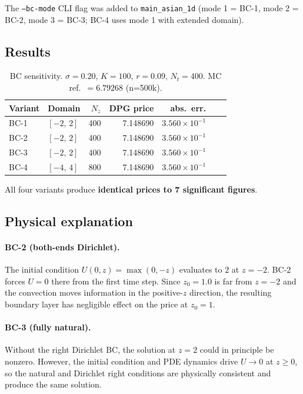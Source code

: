 \documentclass[11pt,a4paper]{article}
\newcommand{\Nz}{N_z}
\newcommand{\Nt}{N_t}
\begin{document}
The \texttt{--bc-mode} CLI flag was added to \texttt{main\_asian\_1d}
(mode 1 = BC-1, mode 2 = BC-2, mode 3 = BC-3; BC-4 uses mode 1 with
extended domain).

\subsection{Results}

\begin{table}[htbp]
\centering
\caption{BC sensitivity.  $\sigma = 0.20$, $K = 100$,
         $r = 0.09$, $\Nt = 400$.  MC ref.\ $= 6.79268$ (n=500k).}
\label{tab:bcsens}
\begin{tabular}{llrrrrr}
\toprule
Variant & Domain & $\Nz$ & DPG price & abs.\ err. \\
\midrule
BC-1 & $[-2,\,2]$ & 400 & 7.148690 & $3.560\times10^{-1}$ \\
BC-2 & $[-2,\,2]$ & 400 & 7.148690 & $3.560\times10^{-1}$ \\
BC-3 & $[-2,\,2]$ & 400 & 7.148690 & $3.560\times10^{-1}$ \\
BC-4 & $[-4,\,4]$ & 800 & 7.148690 & $3.560\times10^{-1}$ \\
\bottomrule
\end{tabular}
\end{table}

All four variants produce \textbf{identical prices to 7 significant
figures}.

\subsection{Physical explanation}

\paragraph{BC-2 (both-ends Dirichlet).}
The initial condition $U(0, z) = \max(0, -z)$ evaluates to $2$ at
$z = -2$.  BC-2 forces $U = 0$ there from the first time step.
Since $z_0 = 1.0$ is far from $z = -2$ and the convection moves
information in the positive-$z$ direction, the resulting boundary
layer has negligible effect on the price at $z_0 = 1$.

\paragraph{BC-3 (fully natural).}
Without the right Dirichlet BC, the solution at $z = 2$ could in
principle be nonzero.  However, the initial condition and PDE dynamics
drive $U \to 0$ at $z \ge 0$, so the natural and Dirichlet right
conditions are physically consistent and produce the same solution.
\end{document}
